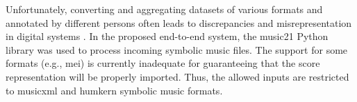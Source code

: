 

Unfortunately, converting and aggregating datasets of
various formats and annotated by different persons often
leads to discrepancies and misrepresentation in digital
systems \parencite{napoleslopez2018encoding,
napoleslopez2019effects}. In the proposed end-to-end system,
the music21 Python library \parencite{cuthbert2010music21}
was used to process incoming symbolic music files. The
support for some formats (e.g., \gls{mei}) is currently
inadequate for guaranteeing that the score representation
will be properly imported. Thus, the allowed inputs are
restricted to \gls{musicxml} and \gls{humkern} symbolic
music formats.
